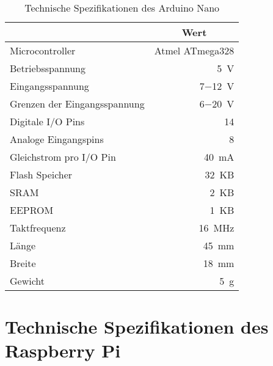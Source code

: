\begin{table}[ht]
\caption{Technische Spezifikationen des Arduino Nano}
\begin{center}
\begin{tabular}{|l|r|}
\hline
\rowcolor{lightgray} \multicolumn{1}{|c|}{\textbf{Spezifikation}} & \multicolumn{1}{|c|}{\textbf{Wert}}\\
\hline
Microcontroller & Atmel ATmega328\\
\hline
Betriebsspannung & \SI{5}{\volt}\\
\hline
Eingangsspannung & \SI{7}{}$-$\SI{12}{\volt}\\
\hline
Grenzen der Eingangsspannung & \SI{6}{}$-$\SI{20}{\volt}\\
\hline
Digitale I/O Pins & \SI{14}{}\\
\hline
Analoge Eingangspins & \SI{8}{}\\
\hline
Gleichstrom pro I/O Pin & \SI{40}{\milli\ampere}\\
\hline
Flash Speicher & \SI{32}{KB}\\
\hline
SRAM & \SI{2}{KB} \\
\hline
EEPROM & \SI{1}{KB}\\
\hline
Taktfrequenz & \SI{16}{\mega\Hz}\\
\hline
Länge & \SI{45}{\milli\meter}\\
\hline
Breite & \SI{18}{\milli\meter}\\
\hline
Gewicht & \SI{5}{\gram}\\
\hline
\end{tabular}
\end{center}
\label{tab:arduino}
\end{table}

\clearpage{}

\section{Technische Spezifikationen des Raspberry Pi}
\label{app:raspberry}

